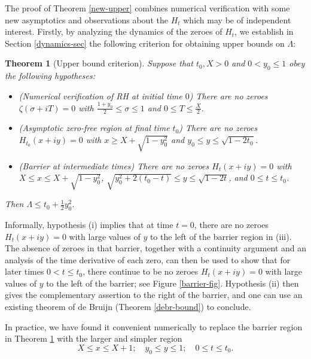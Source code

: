 \documentclass[a4paper,11pt,twoside]{amsart}
\newtheorem{theorem}{Theorem}[section]
\begin{document}
The proof of Theorem \ref{new-upper} combines numerical verification with some new asymptotics and observations about the $H_t$ which may be of independent interest.  Firstly, by analyzing the dynamics of the zeroes of $H_t$, we establish in Section \ref{dynamics-sec} the following criterion for obtaining upper bounds on $\Lambda$:

\begin{theorem}[Upper bound criterion]\label{ubc-0}  Suppose that $t_0, X > 0$ and $0 < y_0 \leq 1$ obey the following hypotheses:
\begin{itemize}
\item[(i)]  (Numerical verification of RH at initial time $0$) There are no zeroes $\zeta(\sigma+iT) = 0$ with $\frac{1+y_0}{2} \leq \sigma \leq 1$ and $0 \leq T \leq \frac{X}{2}$.
\item[(ii)]  (Asymptotic zero-free region at final time $t_0$) There are no zeroes $H_{t_0}(x+iy)=0$ with $x \geq X+\sqrt{1-y_0^2}$ and $y_0 \leq y \leq \sqrt{1-2t_0}$.
\item[(iii)]  (Barrier at intermediate times) There are no zeroes $H_{t}(x+iy)=0$ with $X \leq x \leq X+\sqrt{1-y_0^2}$, $\sqrt{y_0^2+2(t_0-t)} \leq y \leq \sqrt{1-2t}$, and $0 \leq t \leq t_0$.
\end{itemize}
Then $\Lambda \leq t_0 + \frac{1}{2} y_0^2$.
\end{theorem}

Informally, hypothesis (i) implies that at time $t=0$, there are no zeroes $H_t(x+iy)=0$ with large values of $y$ to the left of the barrier region in (iii).  The absence of zeroes in that barrier, together with a continuity argument and an analysis of the time derivative of each zero, can then be used to show that for later times $0 < t \leq t_0$, there continue to be no zeroes $H_t(x+iy)=0$ with large values of $y$ to the left of the barrier; see Figure \ref{barrier-fig}.  Hypothesis (ii) then gives the complementary assertion to the right of the barrier, and one can use an existing theorem of de Bruijn (Theorem \ref{debr-bound}) to conclude.

In practice, we have found it convenient numerically to replace the barrier region in Theorem \ref{ubc-0} with the larger and simpler region
$$ X \leq x \leq X+1; \quad y_0 \leq y \leq 1; \quad 0 \leq t \leq t_0.$$
\end{document}
